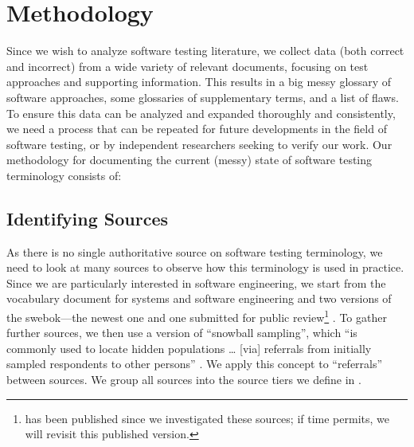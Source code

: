 \section{Methodology}\label{methodology}

Since we wish to analyze software testing literature, we collect data (both
correct and incorrect) from a wide variety of relevant documents, focusing on
test approaches and supporting information. This results in a big messy
glossary of software approaches, some glossaries of supplementary terms, and a
list of flaws. To ensure this data can be analyzed and expanded thoroughly and
consistently, we need a process that can be repeated for future developments in
the field of software testing, or by independent researchers seeking to verify
our work. Our methodology for documenting the current (messy) state of software
testing terminology consists of:



\subsection{Identifying Sources}\label{ident-sources}
As there is no single authoritative source on software testing terminology,
we need to look at many sources to observe how this terminology is used in
practice. Since we are particularly interested in software engineering, we
start from the vocabulary document for systems and software engineering%
\citep{IEEE2017} and two versions of the \acf{swebok}---the newest
one \citep{SWEBOK2014} and one submitted for public review\footnote{
     \citep{SWEBOK2024} has been published since we investigated
    these sources; if time permits, we will revisit this published version.
} \citep{SWEBOK2024}. To gather further sources, we then use a version of
``snowball sampling'',
which ``is commonly used to locate hidden populations \dots{} [via] referrals
from initially sampled respondents to other persons'' \citep{Johnson2014}. We
apply this concept to ``referrals'' between sources. \addTextEx{} We group all
sources into the source tiers we define in \listAllSrcs{}.


